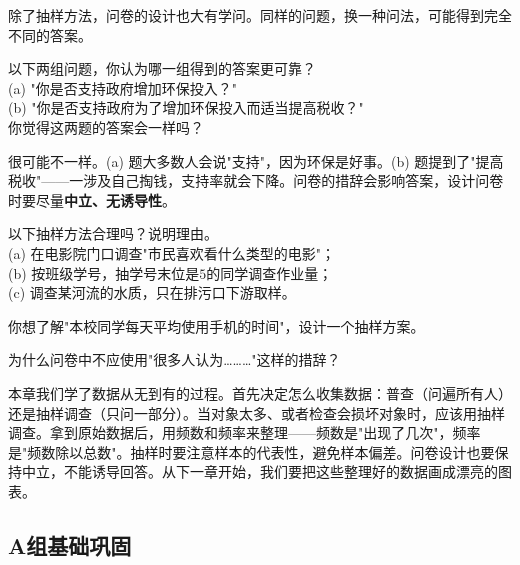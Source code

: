 除了抽样方法，问卷的设计也大有学问。同样的问题，换一种问法，可能得到完全不同的答案。

\begin{example}
以下两组问题，你认为哪一组得到的答案更可靠？\\
(a) "你是否支持政府增加环保投入？"\\
(b) "你是否支持政府为了增加环保投入而适当提高税收？"\\
你觉得这两题的答案会一样吗？
\end{example}
\begin{solution}
很可能不一样。(a) 题大多数人会说"支持"，因为环保是好事。(b) 题提到了"提高税收"——一涉及自己掏钱，支持率就会下降。问卷的措辞会影响答案，设计问卷时要尽量\textbf{中立、无诱导性}。
\end{solution}

\begin{exercise}
\item 以下抽样方法合理吗？说明理由。\\
(a) 在电影院门口调查"市民喜欢看什么类型的电影"；\\
(b) 按班级学号，抽学号末位是$5$的同学调查作业量；\\
(c) 调查某河流的水质，只在排污口下游取样。
\item 你想了解"本校同学每天平均使用手机的时间"，设计一个抽样方案。
\item 为什么问卷中不应使用"很多人认为\ldots{}\ldots\ldots"这样的措辞？
\end{exercise}


本章我们学了数据从无到有的过程。首先决定怎么收集数据：普查（问遍所有人）还是抽样调查（只问一部分）。当对象太多、或者检查会损坏对象时，应该用抽样调查。拿到原始数据后，用频数和频率来整理——频数是"出现了几次"，频率是"频数除以总数"。抽样时要注意样本的代表性，避免样本偏差。问卷设计也要保持中立，不能诱导回答。从下一章开始，我们要把这些整理好的数据画成漂亮的图表。


\subsection*{A组\quad 基础巩固}

